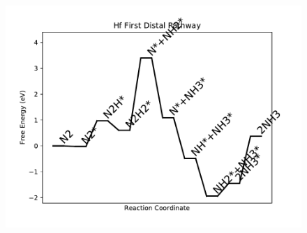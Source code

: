 \begin{figure}
\centering
\includegraphics[width=0.8\linewidth]{data/plots/Hf_distal_1.pdf}
\end{figure}

